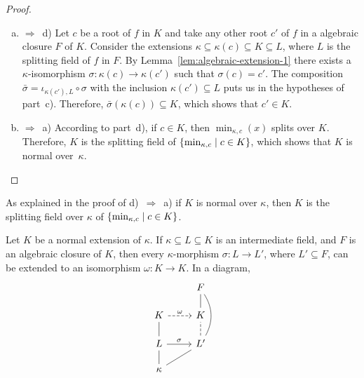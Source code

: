 \begin{proof}
\begin{enumerate}[a), font=\upshape]
        \item $\Rightarrow$~d) Let $c$ be a root of $f$ in $K$ and take any other root $c'$ of $f$ in a algebraic closure $F$ of $K$. Consider the extensions $\kappa\subseteq\kappa(c)\subseteq K\subseteq L$, where $L$ is the splitting field of $f$ in $F$. By Lemma~\ref{lem:algebraic-extension-1} there exists a $\kappa$-isomorphism $\sigma\colon\kappa(c)\to\kappa(c')$ such that $\sigma(c)=c'$. The composition $\bar\sigma=\iota_{\kappa(c'),L}\circ\sigma$ with the inclusion $\kappa(c')\subseteq L$ puts us in the hypotheses of part~c). Therefore, $\bar\sigma(\kappa(c))\subseteq K$, which shows that $c'\in K$.

        \item $\Rightarrow$~a) According to part~d), if $c\in K$, then $\min_{\kappa,c}(x)$ splits over $K$. Therefore, $K$ is the splitting field of $\{\min_{\kappa,c}\mid c\in K\}$, which shows that $K$ is normal over~$\kappa$. \qedhere
    \end{enumerate}

\end{proof}

\begin{rem}
    As explained in the proof of d)~$\Rightarrow$~a) if $K$ is normal over $\kappa$, then $K$ is the splitting field over $\kappa$ of $\{\min_{\kappa,c}\mid c\in K\}$.
\end{rem}

\begin{cor}\label{cor:extension-to-normal}
    Let $K$ be a normal extension of $\kappa$. If $\kappa\subseteq L\subseteq K$ is an intermediate field, and $F$ is an algebraic closure of $K$, then every $\kappa$-morphism $\sigma\colon L\to L'$, where $L'\subseteq F$, can be extended to an isomorphism $\omega\colon K\to K$. In a diagram,
    \small
    $$
        \begin{tikzcd}[row sep=0.5cm]
                &F\\
            K
                    \arrow[r,dashed, "\omega"]
                &K
                    \arrow[u,no head]\\
            L
                    \arrow[r,"\sigma"]
                    \arrow[u,no head]
                &L'
                    \arrow[u,no head,dashed]
                    \arrow[uu,no head,bend right]\\
            \kappa
                    \arrow[u,no head]
                    \arrow[ur,no head]
        \end{tikzcd}    
    $$
    \normalsize
\end{cor}

